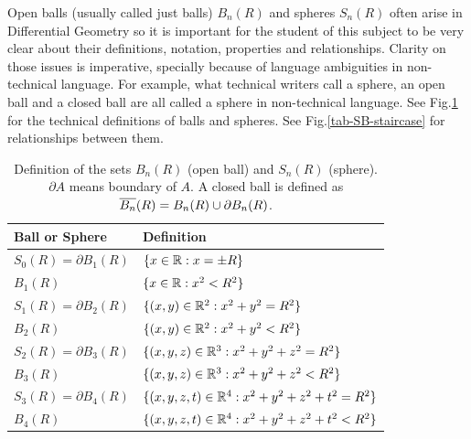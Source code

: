 Open balls (usually called just balls) $B_n(R)$ and spheres $S_n(R)$ often arise in Differential 
Geometry so it is important for the student of this subject to
be very clear about their definitions, notation, properties and relationships. 
Clarity on those issues 
is imperative, specially because of language ambiguities in non-technical language. For example, what technical writers call a sphere, an open ball and a closed ball are all called a sphere in non-technical language.
See
Fig.\ref{tab-ball-sphere-defs} for the technical definitions of balls and spheres. 
See Fig.\ref{tab-SB-staircase}
for relationships between them.

\begin{table}[h!]
\centering
\begin{tabular}{|l|l|}
\hline
\rowcolor[HTML]{FFFC9E} 
Ball or Sphere & Definition \\ \hline
\rowcolor[HTML]{FFFFFF} 
$S_0(R)=\partial B_1(R)$ & $\{x\in{ \mathbb{R}}: x=\pm R \}$ \\ \hline
\rowcolor[HTML]{FFFFFF} 
$B_1(R)$ & \cellcolor[HTML]{FFFFFF}$\{x\in{ \mathbb{R}}: x^2<R^2 \}$ \\ \hline
$S_1(R)=\partial B_2(R)$ & \cellcolor[HTML]{FFFFFF}$\{(x,y)\in{ \mathbb{R}}^2: x^2 + y^2 =R^2 \}$ \\ \hline
$B_2(R)$ & \cellcolor[HTML]{FFFFFF}$\{(x,y)\in{ \mathbb{R}}^2: x^2 + y^2 < R^2 \}$ \\ \hline
$S_2(R)=\partial B_3(R)$ & $\{(x,y, z)\in{ \mathbb{R}}^3: x^2 + y^2 + z^2= R^2 \}$ \\ \hline
$B_3(R)$ & $\{(x,y, z)\in{ \mathbb{R}}^3: x^2 + y^2 + z^2< R^2 \}$ \\ \hline
$S_3(R)=\partial B_4(R)$ & $\{(x,y, z, t)\in{ \mathbb{R}}^4: x^2 + y^2 + z^2 + t^2= R^2 \}$ \\ \hline
$B_4(R)$ & $\{(x,y, z, t)\in{ \mathbb{R}}^4: x^2 + y^2 + z^2 + t^2< R^2 \}$ \\ \hline
\end{tabular}
\caption{Definition of the sets $B_n(R)$ (open ball) and $S_n(R)$ (sphere). $\partial A$ means boundary of $A$. A closed ball is defined as $\overline{B_n}(R)= B_n(R)
\cup \partial B_n(R)$.}
\label{tab-ball-sphere-defs}
\end{table}



